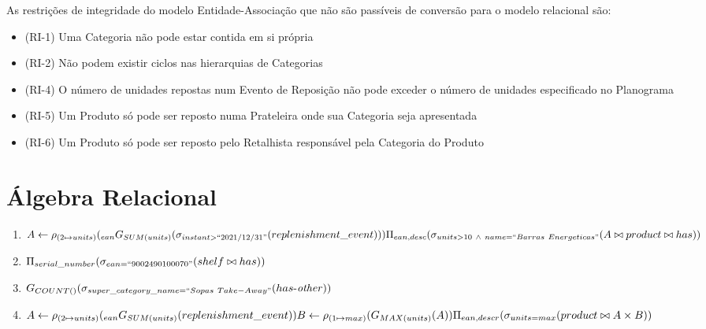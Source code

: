 \documentclass{article}
\newcommand{\select}{\sigma}
\newcommand{\project}{\Pi}
\newcommand{\njoin}{\bowtie}
\newcommand{\rename}{\rho}
\newcommand{\aggregatefn}{\mbox{$G$}}
\begin{document}
	As restrições de integridade do modelo Entidade-Associação que não são passíveis de conversão para o modelo relacional são:
	\begin{itemize}
		\item (RI-1) Uma Categoria não pode estar contida em si própria
		\item (RI-2) Não podem existir ciclos nas hierarquias de Categorias
		\item (RI-4) O número de unidades repostas num Evento de Reposição não pode exceder o número de unidades especificado no Planograma
		\item (RI-5) Um Produto só pode ser reposto numa Prateleira onde sua Categoria seja apresentada
		\item (RI-6) Um Produto só pode ser reposto pelo Retalhista responsável pela Categoria do Produto
	\end{itemize}

	\pagebreak

	\section*{Álgebra Relacional}

	\newcommand\responsiblefor{\mathop{\mbox{$responsible$-$\mathit{for}$}}}
	\newcommand\hasother{\mathop{\mbox{$has$-$\mathit{other}$}}}

	\begin{enumerate}[label=\arabic*)]

		\item $A \leftarrow \rename_{(2 \mapsto units)}(_{ean} \aggregatefn_{SUM(units)}(\select_{instant > ``2021/12/31"}(replenishment\_event)))\\
		       \project_{ean, desc}(\select_{units > 10\ \wedge\ name = ``Barras\ Energeticas"}(A \njoin product \njoin has))$

		\item $\project_{serial\_number}(\select_{ean = ``9002490100070"}(shelf \njoin has))$

		\item $\aggregatefn_{COUNT()}(\select_{super\_category\_name = ``Sopas\ Take-Away"}(\hasother))$

		\item $A \leftarrow \rename_{(2 \mapsto units)}(_{ean}\aggregatefn_{SUM(units)}(replenishment\_event))\\
		       B \leftarrow \rename_{(1 \mapsto max)}(\aggregatefn_{MAX(units)}(A))\\
		       \project_{ean, descr}(\select_{units=max}(product \njoin A \times B))$

	\end{enumerate}
\end{document}
